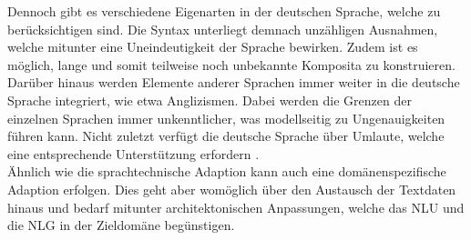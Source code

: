 \noindent
Dennoch gibt es verschiedene Eigenarten in der deutschen Sprache, welche zu berücksichtigen sind. Die Syntax unterliegt demnach unzähligen Ausnahmen, welche mitunter eine Uneindeutigkeit der Sprache bewirken. Zudem ist es möglich, lange und somit teilweise noch unbekannte Komposita zu konstruieren. Darüber hinaus werden Elemente anderer Sprachen immer weiter in die deutsche Sprache integriert, wie etwa Anglizismen. Dabei werden die Grenzen der einzelnen Sprachen immer unkenntlicher, was modellseitig zu Ungenauigkeiten führen kann. Nicht zuletzt verfügt die deutsche Sprache über Umlaute, welche eine entsprechende Unterstützung erfordern \cite{SPR16}.\\

\noindent
Ähnlich wie die sprachtechnische Adaption kann auch eine domänenspezifische Adaption erfolgen. Dies geht aber womöglich über den Austausch der Textdaten hinaus und bedarf mitunter architektonischen Anpassungen, welche das \ac{NLU} und die \ac{NLG} in der Zieldomäne begünstigen.
